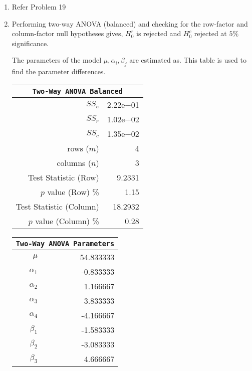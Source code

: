 \begin{enumerate}
	
	\item Refer Problem 19
	
	\item Performing two-way ANOVA (balanced) and checking for the row-factor and column-factor null hypotheses gives,
	$ H_0^r $ is rejected and $ H_0^c $ rejected at $ 5\% $ significance.
	
	The parameters of the model $ \mu, \alpha_i, \beta_j $ are estimated as. This table is used to find the parameter differences.
	
	
	\begin{table}[H]
		\centering
		\begin{minipage}{0.4\textwidth}
			\centering
			\begin{tabular}{@{}rr@{}}
				\toprule
				\multicolumn{2}{c}{\texttt{Two-Way ANOVA Balanced}} \\
				\midrule
				$SS_e$                  &               2.22e+01 \\
				$SS_r$                  &               1.02e+02 \\
				$SS_c$                  &               1.35e+02 \\
				rows ($m$)              &                      4 \\
				columns ($n$)           &                      3 \\
				Test Statistic (Row)    &                 9.2331 \\
				$p$ value (Row) \%      &                   1.15 \\
				Test Statistic (Column) &                18.2932 \\
				$p$ value (Column) \%   &                   0.28 \\
				\bottomrule
			\end{tabular}
		\end{minipage}
		\begin{minipage}{0.4\textwidth}
			\centering
			\begin{tabular}{@{}rr@{}}
				\toprule
				\multicolumn{2}{c}{\texttt{Two-Way ANOVA Parameters}} \\
				\midrule
				$\mu$      &                54.833333 \\
				$\alpha_1$ &                -0.833333 \\
				$\alpha_2$ &                 1.166667 \\
				$\alpha_3$ &                 3.833333 \\
				$\alpha_4$ &                -4.166667 \\
				$\beta_1$  &                -1.583333 \\
				$\beta_2$  &                -3.083333 \\
				$\beta_3$  &                 4.666667 \\
				\bottomrule
			\end{tabular}
		\end{minipage}
	\end{table}
	\bigskip
	

\end{enumerate}
